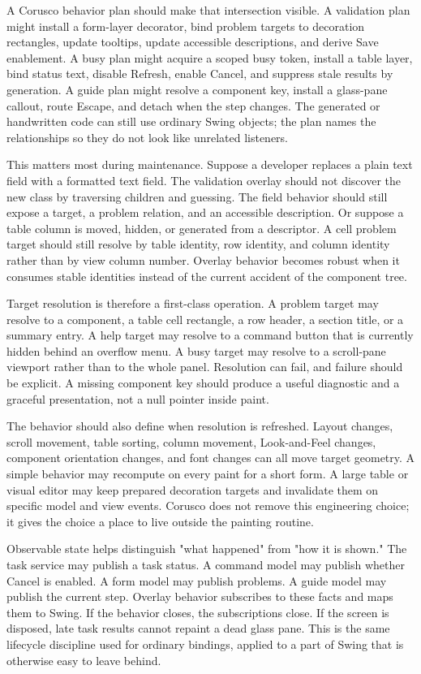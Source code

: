 A Corusco behavior plan should make that intersection visible. A validation
plan might install a form-layer decorator, bind problem targets to decoration
rectangles, update tooltips, update accessible descriptions, and derive Save
enablement. A busy plan might acquire a scoped busy token, install a table
layer, bind status text, disable Refresh, enable Cancel, and suppress stale
results by generation. A guide plan might resolve a component key, install a
glass-pane callout, route Escape, and detach when the step changes. The
generated or handwritten code can still use ordinary Swing objects; the plan
names the relationships so they do not look like unrelated listeners.

This matters most during maintenance. Suppose a developer replaces a plain text
field with a formatted text field. The validation overlay should not discover
the new class by traversing children and guessing. The field behavior should
still expose a target, a problem relation, and an accessible description. Or
suppose a table column is moved, hidden, or generated from a descriptor. A cell
problem target should still resolve by table identity, row identity, and column
identity rather than by view column number. Overlay behavior becomes robust
when it consumes stable identities instead of the current accident of the
component tree.

Target resolution is therefore a first-class operation. A problem target may
resolve to a component, a table cell rectangle, a row header, a section title,
or a summary entry. A help target may resolve to a command button that is
currently hidden behind an overflow menu. A busy target may resolve to a
scroll-pane viewport rather than to the whole panel. Resolution can fail, and
failure should be explicit. A missing component key should produce a useful
diagnostic and a graceful presentation, not a null pointer inside paint.

The behavior should also define when resolution is refreshed. Layout changes,
scroll movement, table sorting, column movement, Look-and-Feel changes,
component orientation changes, and font changes can all move target geometry.
A simple behavior may recompute on every paint for a short form. A large table
or visual editor may keep prepared decoration targets and invalidate them on
specific model and view events. Corusco does not remove this engineering
choice; it gives the choice a place to live outside the painting routine.

Observable state helps distinguish "what happened" from "how it is shown."
The task service may publish a task status. A command model may publish
whether Cancel is enabled. A form model may publish problems. A guide model may
publish the current step. Overlay behavior subscribes to these facts and maps
them to Swing. If the behavior closes, the subscriptions close. If the screen
is disposed, late task results cannot repaint a dead glass pane. This is the
same lifecycle discipline used for ordinary bindings, applied to a part of
Swing that is otherwise easy to leave behind.

